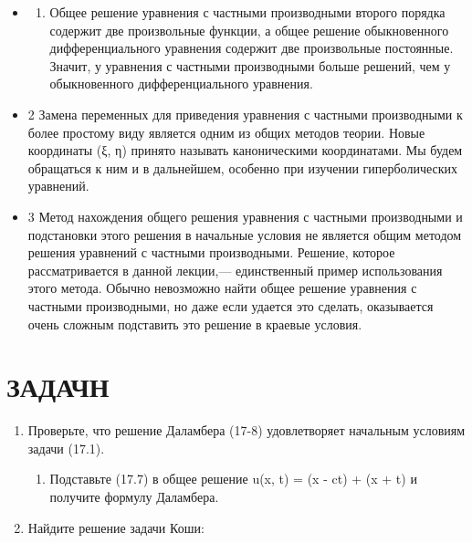 \documentclass[
  ukrainian,
]{article}
\providecommand{\tightlist}{%
  \setlength{\itemsep}{0pt}\setlength{\parskip}{0pt}}
\begin{document}
\begin{itemize}
\item
  \begin{enumerate}
  \def\labelenumi{\arabic{enumi}.}
  \tightlist
  \item
    Общее решение уравнения с частными производными второго порядка
    содержит две произвольные функции, а общее решение обыкновенного
    дифференциального уравнения содержит две произвольные постоянные.
    Значит, у уравнения с частными производными больше решений, чем у
    обыкновенного дифференциального уравнения.
  \end{enumerate}
\item
  2 Замена переменных для приведения уравнения с частными производными к
  более простому виду является одним из общих методов теории. Новые
  координаты (ξ, η) принято называть каноническими координатами. Мы
  будем обращаться к ним и в дальнейшем, особенно при изучении
  гиперболических уравнений.
\item
  3 Метод нахождения общего решения уравнения с частными производными и
  подстановки этого решения в начальные условия не является общим
  методом решения уравнений с частными производными. Решение, которое
  рассматривается в данной лекции,--- единственный пример использования
  этого метода. Обычно невозможно найти общее решение уравнения с
  частными производными, но даже если удается это сделать, оказывается
  очень сложным подставить это решение в краевые условия.
\end{itemize}

\section{ЗАДАЧН}\label{ux437ux430ux434ux430ux447ux43d}

\begin{enumerate}
\def\labelenumi{\arabic{enumi}.}
\item
  Проверьте, что решение Даламбера (17-8) удовлетворяет начальным
  условиям задачи (17.1).

  \begin{enumerate}
  \def\labelenumii{\arabic{enumii}.}
  \setcounter{enumii}{1}
  \tightlist
  \item
    Подставьте (17.7) в общее решение u(x, t) = \psi(x - ct) + \psi(x +
    \epsilon t) и получите формулу Даламбера.
  \end{enumerate}
\item
  Найдите решение задачи Коши:
\end{enumerate}
\end{document}
